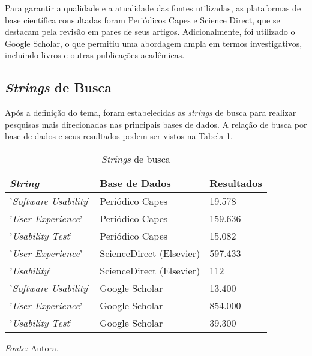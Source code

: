 Para garantir a qualidade e a atualidade das fontes utilizadas, as plataformas de base científica consultadas foram Periódicos Capes e Science Direct, que se destacam pela revisão em pares de seus artigos. Adicionalmente, foi utilizado o Google Scholar, o que permitiu uma abordagem ampla em termos investigativos, incluindo livros e outras publicações acadêmicas. 

\subsection{\textit{Strings} de Busca}
\label{sec:Strings de Busca}
Após a definição do tema, foram estabelecidas as \textit{strings} de busca para realizar pesquisas mais direcionadas nas principais bases de dados. A relação de busca por base de dados e seus resultados podem ser vistos na Tabela \ref{tab04}.

\begin{table}[h]
	\centering
	\caption{\textit{Strings} de busca}
	\begin{adjustbox}{center}
	\label{tab04}
	\begin{tabular}{l|l|l}
	\hline
	\textit{String}               & Base de Dados            & Resultados \\ \hline
	'\textit{Software Usability}' & Periódico Capes          & 19.578     \\ \hline
	'\textit{User Experience}'    & Periódico Capes          & 159.636    \\ \hline
	'\textit{Usability Test}'     & Periódico Capes          & 15.082     \\ \hline
	'\textit{User Experience}'    & ScienceDirect (Elsevier) & 597.433    \\ \hline
	'\textit{Usability}'          & ScienceDirect (Elsevier) & 112        \\ \hline
	'\textit{Software Usability}' & Google Scholar           & 13.400     \\ \hline
	'\textit{User Experience}'    & Google Scholar           & 854.000    \\ \hline
	'\textit{Usability Test}'     & Google Scholar           & 39.300     \\ \hline
	\end{tabular}
	\end{adjustbox}
	\begin{tablenotes}[flushleft]
		\centering
		\item \textit{Fonte:} Autora.
	\end{tablenotes}
\end{table}

